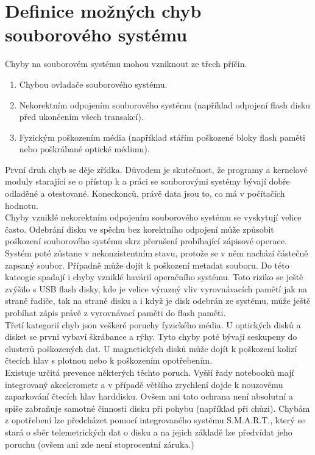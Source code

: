 \chapter{Definice možných chyb souborového systému}
\label{ch:definice-chyb}
Chyby na souborovém systému mohou vzniknout ze třech příčin. 
\begin{enumerate}
    \item Chybou ovladače souborového systému.
    \item Nekorektním odpojením souborového systému (například odpojení flash disku před ukončením všech transakcí).
    \item Fyzickým poškozením média (například stářím poškozené bloky flash paměti nebo poškrábané optické médium).
\end{enumerate}
První druh chyb se děje zřídka. Důvodem je skutečnost, že programy a kernelové moduly starající se o přístup k a práci se souborovými systémy bývají dobře odladěné a otestované. Koneckonců, právě data jsou to, co má v počítačích hodnotu.\\
Chyby vzniklé nekorektním odpojením souborového systému se vyskytují velice často. Odebrání disku ve spěchu bez korektního odpojení může způsobit poškození souborového systému skrz přerušení probíhající zápisové operace. Systém poté zůstane v nekonzistentním stavu, protože se v něm nachází částečně zapsaný soubor. Případně může dojít k poškození metadat souboru. Do této kateogie spadají i chyby vzniklé havárií operačního systému. Toto riziko se ještě zvýšilo s USB flash disky, kde je velice výrazný vliv vyrovnávacích pamětí jak na straně řadiče, tak na straně disku a i když je disk odebrán ze systému, může ještě probíhat zápis právě z vyrovnávací paměti do flash paměti.\\
Třetí kategorií chyb jsou veškeré poruchy fyzického média. U optických disků a disket se první vybaví škrábance a rýhy. Tyto chyby poté bývají seskupeny do clusterů poškozených dat. U magnetických disků může dojít k poškození kolizí čtecích hlav s plotnou nebo k poškozením opotřebením.\\
Existuje určitá prevence některých těchto poruch. Vyšší řady notebooků mají integrovaný akcelerometr a v případě většího zrychlení dojde k nouzovému zaparkování čtecích hlav harddisku. Ovšem ani tato ochrana není absolutní a spíše zabraňuje samotné činnosti disku při pohybu (například při chůzi). Chybám z opotřebení lze předcházet pomocí integrovaného systému S.M.A.R.T., který se stará o sběr telemetrických dat o disku a na jejich základě lze předvídat jeho poruchu (ovšem ani zde není stoprocentní záruka.)\\
